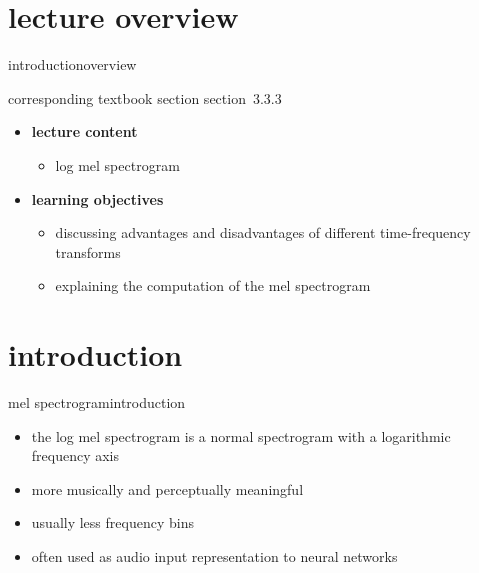


\subtitle{module 3.3.3: time-frequency representations~---~(Log) Mel-spectrogram}


	

    \section[overview]{lecture overview}
        \begin{frame}{introduction}{overview}
            \begin{block}{corresponding textbook section}
                    section~3.3.3
            \end{block}

            \begin{itemize}
                \item   \textbf{lecture content}
                    \begin{itemize}
                        \item   log mel spectrogram
                    \end{itemize}
                \bigskip
                \item<2->   \textbf{learning objectives}
                    \begin{itemize}
                        \item   discussing advantages and disadvantages of different time-frequency transforms
                        \item   explaining the computation of the mel spectrogram
                    \end{itemize}
            \end{itemize}
        \end{frame}
        
    \section[intro]{introduction}
        \begin{frame}{mel spectrogram}{introduction}
            \begin{itemize}
                \item   the log mel spectrogram is a normal spectrogram with a logarithmic frequency axis
                \bigskip
                \item   more musically and perceptually meaningful
                \item   usually less frequency bins
                \item   often used as audio input representation to neural networks
            \end{itemize}
        \end{frame}
        

